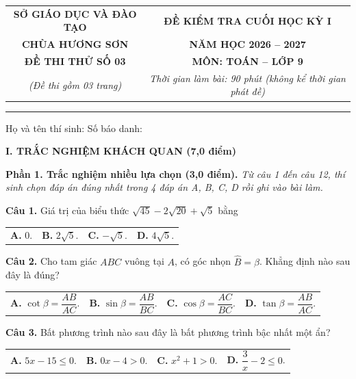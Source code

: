 \documentclass[11pt,a4paper]{article}
\begin{document}
\noindent
\begin{tabular*}{\linewidth}{@{\extracolsep{\fill}}cc@{}}
\textbf{SỞ GIÁO DỤC VÀ ĐÀO TẠO} & \textbf{ĐỀ KIỂM TRA CUỐI HỌC KỲ I} \\
\textbf{CHÙA HƯƠNG SƠN} & \textbf{NĂM HỌC 2026 -- 2027} \\
\textbf{ĐỀ THI THỬ SỐ 03} & \textbf{MÔN: TOÁN -- LỚP 9} \\
\textit{(Đề thi gồm 03 trang)} & \textit{Thời gian làm bài: 90 phút (không kể thời gian phát đề)} \\
\end{tabular*}

\vspace{2mm}
\noindent
\rule{\linewidth}{0.8pt}

\vspace{1mm}
\noindent
Họ và tên thí sinh: \dotfill Số báo danh: \dotfill

\vspace{2mm}
\noindent
\textbf{\large I. TRẮC NGHIỆM KHÁCH QUAN (7,0 điểm)}

\vspace{1mm}
\noindent
\textbf{Phần 1. Trắc nghiệm nhiều lựa chọn (3,0 điểm).} \textit{Từ câu 1 đến câu 12, thí sinh chọn đáp án đúng nhất trong 4 đáp án A, B, C, D rồi ghi vào bài làm.}

\vspace{1.5mm}
\textbf{Câu 1.} Giá trị của biểu thức $\sqrt{45} - 2\sqrt{20} + \sqrt{5}$ bằng\\
\begin{tabularx}{\linewidth}{XXXX}
\textbf{A.} $0$. & \textbf{B.} $2\sqrt{5}$. & \textbf{C.} $-\sqrt{5}$. & \textbf{D.} $4\sqrt{5}$.
\end{tabularx}

\vspace{1.5mm}
\textbf{Câu 2.} Cho tam giác $ABC$ vuông tại $A$, có góc nhọn $\widehat{B} = \beta$. Khẳng định nào sau đây là đúng?\\
\begin{tabularx}{\linewidth}{XXXX}
\textbf{A.} $\cot \beta = \dfrac{AB}{AC}$. & \textbf{B.} $\sin \beta = \dfrac{AB}{BC}$. & \textbf{C.} $\cos \beta = \dfrac{AC}{BC}$. & \textbf{D.} $\tan \beta = \dfrac{AB}{AC}$.
\end{tabularx}

\vspace{1.5mm}
\textbf{Câu 3.} Bất phương trình nào sau đây là bất phương trình bậc nhất một ẩn?\\
\begin{tabularx}{\linewidth}{XXXX}
\textbf{A.} $5x - 15 \le 0$. & \textbf{B.} $0x - 4 > 0$. & \textbf{C.} $x^2 + 1 > 0$. & \textbf{D.} $\dfrac{3}{x} - 2 \le 0$.
\end{tabularx}
\end{document}
